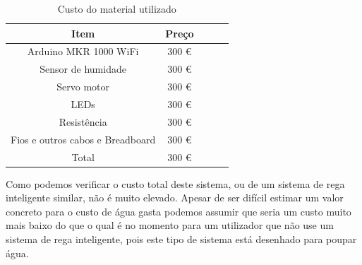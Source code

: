 \documentclass[conference]{IEEEtran}
\begin{document}
\begin{table}[ht]
\centering
\small
\begin{tabular}{|c|c|c|c|c|}
    \hline
    \rowcolor{gray}
    Item & Preço \\
    \hline
    Arduino MKR 1000 WiFi & 300 € \\
    \hline
    Sensor de humidade & 300 € \\
    \hline
    Servo motor & 300 € \\
    \hline
    LEDs & 300 € \\
    \hline
    Resistência & 300 € \\
    \hline
    Fios e outros cabos e Breadboard & 300 € \\
    \hline
    \rowcolor{gray}
    Total & 300 € \\
    \hline
\end{tabular}
\vspace{1em}
\caption{Custo do material utilizado}
\label{pricetable}
\end{table}

Como podemos verificar o custo total deste sistema, ou de um sistema de rega inteligente similar,
não é muito elevado. Apesar de ser difícil estimar um valor concreto para o custo de água gasta
podemos assumir que seria um custo muito mais baixo do que o qual é no momento para um 
utilizador que não use um sistema de rega inteligente, pois este tipo de sistema está desenhado 
para poupar água.













\end{document}
